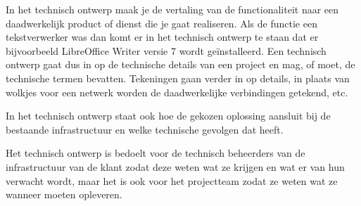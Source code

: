 
In het technisch ontwerp maak je de vertaling van de functionaliteit naar een daadwerkelijk product of dienst die je gaat realiseren. Als de functie een tekstverwerker was dan komt er in het technisch ontwerp te staan dat er bijvoorbeeld LibreOffice Writer versie 7 wordt ge\"installeerd. Een technisch ontwerp gaat dus in op de technische details van een project en mag, of moet, de technische termen bevatten. Tekeningen gaan verder in op details, in plaats van wolkjes voor een netwerk worden de daadwerkelijke verbindingen getekend, etc.

In het technisch ontwerp staat ook hoe de gekozen oplossing aansluit bij de bestaande infrastructuur en welke technische gevolgen dat heeft.

Het technisch ontwerp is bedoelt voor de technisch beheerders van de infrastructuur van de klant zodat deze weten wat ze krijgen en wat er van hun verwacht wordt, maar het is ook voor het projectteam zodat ze weten wat ze wanneer moeten opleveren.

